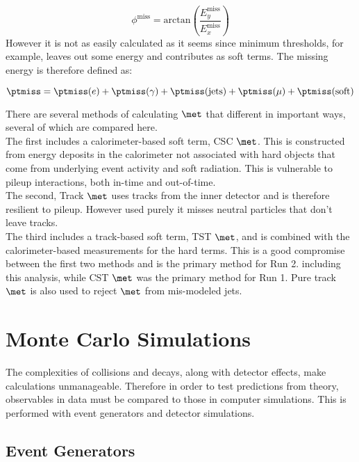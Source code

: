 \begin{equation}
\phi^{\mathrm{miss}} = \mathrm{arctan}(\frac{E_{y}^{\mathrm{miss}}}{E_{x}^{\mathrm{miss}}})
\end{equation}
However it is not as easily calculated as it seems since minimum thresholds, for example, leaves out some energy and contributes as soft terms.  The missing energy is therefore defined as:

\begin{equation}
\ptmiss = \ptmiss(e) + \ptmiss(\gamma) + \ptmiss({\rm jets}) + \ptmiss(\mu) + \ptmiss({\rm soft})
\label{eq:met}
\end{equation}


There are several methods of calculating $\met$ that different in important ways, several of which are compared here\cite{metrun2}. \\

The first  includes a calorimeter-based soft term, CSC $\met$.  This is constructed from energy deposits in the calorimeter not associated with hard objects that come from underlying event activity and soft radiation.  This is vulnerable to pileup interactions, both in-time and out-of-time. \\

The second, Track $\met$ uses tracks from the inner detector and is therefore resilient to pileup.  However used purely it misses neutral particles that don't leave tracks. \\

The third includes a track-based soft term, TST $\met$, and is combined with the calorimeter-based measurements for the hard terms.  This is a good compromise between the first two methods and is the primary method for Run 2. including this analysis, while CST $\met$ was the primary method for Run 1.  Pure track $\met$ is also used to reject $\met$ from mis-modeled jets.\\


\section{Monte Carlo Simulations}

The complexities of collisions and decays, along with detector effects, make calculations unmanageable.  Therefore in order to test predictions from theory, observables in data must be compared to those in computer simulations.  This is performed with event generators and detector simulations.

\subsection{Event Generators}

